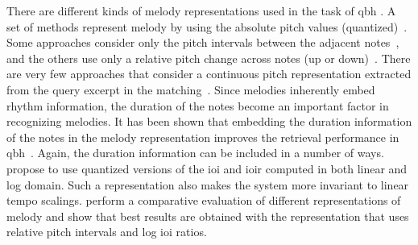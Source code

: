 There are different kinds of melody representations used in the task of \gls{qbh} . A set of methods represent melody by using the absolute pitch values (quantized)~\citep{McNab1996,uitdenbogerd1998manipulation}. Some approaches consider only the pitch intervals between the adjacent notes~\citep{pauws2004cubyhum}, and the others use only a relative pitch change across notes (up or down)~\citep{ghias1995query}. There are very few approaches that consider a continuous pitch representation extracted from the query excerpt in the matching~\citep{mazzoni2001melody}. Since melodies inherently embed rhythm information, the duration of the notes become an important factor in recognizing melodies. It has been shown that embedding the duration information of the notes in the melody representation improves the retrieval performance in \gls{qbh}~\citep{pardo2002encoding}. Again, the duration information can be included in a number of ways. \cite{pardo2002encoding} propose to use quantized versions of the \gls{ioi} and \gls{ioir} computed in both linear and log domain. Such a representation also makes the system more invariant to linear tempo scalings. \cite{dannenberg2007comparative} perform a comparative evaluation of different representations of melody and show that best results are obtained with the representation that uses relative pitch intervals and log \gls{ioi} ratios. 

